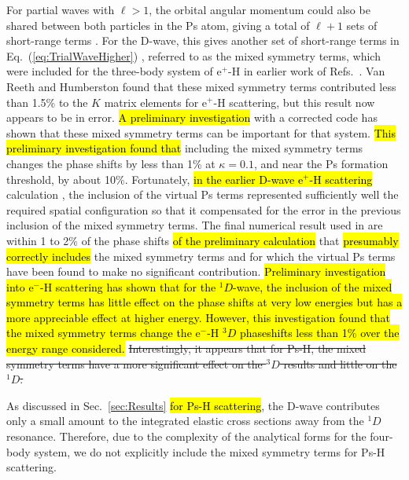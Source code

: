 \documentclass[preprint,showpacs,showkeys,preprintnumbers,amsmath,amssymb,longbibliography,pra,aps]{revtex4-1}
\begin{document}
For partial waves with $\ell>1$, the orbital angular momentum could also be 
shared between both particles in the Ps atom, giving a total of
$\ell + 1$ sets of short-range terms \cite{Schwartz1961a}. For the
D-wave, this gives another set of short-range terms in
Eq.~(\ref{eq:TrialWaveHigher})
\cite{Humberston1997,VanReethThesis,BrownThesis}, referred to as the mixed
symmetry terms, which were included for the three-body system of e$^+$-H
in earlier work of
Refs.~\cite{Brown1985a,BrownThesis,WattsThesis,Humberston1997,VanReeth1997}.
Van Reeth and Humberston \cite{VanReeth1997} found that these
mixed symmetry terms contributed less than 1.5\% to the $K$ matrix elements
for e$^+$-H scattering, but this result now appears to be in error.
\hl{A preliminary investigation} \cite{VanReeth2015} with a corrected code has shown 
that these mixed symmetry terms can be important for that 
system. \hl{This preliminary investigation {\cite{VanReeth2015}} found that}
including the mixed symmetry terms changes
the phase shifts by less than 1\% at $\kappa = 0.1$, and near the Ps formation
threshold, by about 10\%. Fortunately, \hl{in the earlier D-wave e$^+$-H scattering}
calculation \cite{Humberston1997}, the inclusion of the virtual Ps terms
represented sufficiently well the required spatial configuration so that it
compensated for the error in the previous inclusion of the mixed symmetry
terms. The final numerical result used in \cite{VanReeth1997} are
within 1 to 2\% of the phase shifts \hl{of the preliminary
calculation} \cite{VanReeth2015} that \hl{presumably correctly
includes} the mixed symmetry terms and for which the virtual Ps terms have
been found to make no significant contribution. \hl{Preliminary
investigation into e$^-$-H scattering {\cite{VanReeth2015}} has
shown that for the $^1D$-wave, the inclusion of the 
mixed symmetry terms has little effect on the phase shifts at very low
energies but has a more appreciable effect at higher energy. However,
this investigation found that the mixed symmetry terms change the
e$^-$-H $^3D$ phaseshifts less than 1\% over the energy range considered.}
\sout{Interestingly,
it appears that for Ps-H, the mixed symmetry terms have a more significant
effect on the $^3D$ results and little on the $^1D$.}

As discussed in Sec.~\ref{sec:Results} \hl{for Ps-H scattering}, the D-wave 
contributes only a small amount to the integrated elastic cross sections away 
from the $^1D$ resonance. Therefore, due to the complexity of the analytical 
forms for the four-body system, we do not explicitly include the mixed 
symmetry terms for Ps-H scattering.
\end{document}
